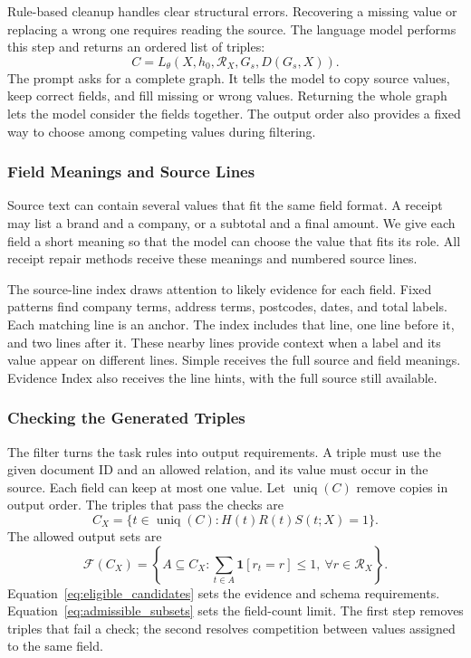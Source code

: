 Rule-based cleanup handles clear structural errors.
Recovering a missing value or replacing a wrong one requires reading the source.
The language model performs this step and returns an ordered list of triples:
\begin{equation}
    \label{eq:proposal_generation}
    C=L_\theta(X,h_0,\mathcal R_X,G_s,D(G_s,X)).
\end{equation}
The prompt asks for a complete graph. It tells the model to copy source
values, keep correct fields, and fill missing or wrong values.
Returning the whole graph lets the model consider the fields together.
The output order also provides a fixed way to choose among competing
values during filtering.

\subsubsection{Field Meanings and Source Lines}
\label{sec:framework:field_evidence}

Source text can contain several values that fit the same field format.
A receipt may list a brand and a company, or a subtotal and a final amount.
We give each field a short meaning so that the model can choose the value
that fits its role. All receipt repair methods receive these meanings
and numbered source lines.

The source-line index draws attention to likely evidence for each field.
Fixed patterns find company terms, address terms, postcodes, dates, and total labels.
Each matching line is an anchor. The index includes that line, one line
before it, and two lines after it. These nearby lines provide context when
a label and its value appear on different lines.
Simple receives the full source and field meanings.
Evidence Index also receives the line hints, with the full source still available.

\subsubsection{Checking the Generated Triples}
\label{sec:framework:constraints}

The filter turns the task rules into output requirements.
A triple must use the given document ID and an allowed relation, and its
value must occur in the source. Each field can keep at most one value.
Let $\operatorname{uniq}(C)$ remove copies in output order.
The triples that pass the checks are
\begin{equation}
    \label{eq:eligible_candidates}
    C_X=\{t\in\operatorname{uniq}(C):H(t)R(t)S(t;X)=1\}.
\end{equation}
The allowed output sets are
\begin{equation}
    \label{eq:admissible_subsets}
    \mathcal F(C_X)=\left\{A\subseteq C_X:
    \sum_{t\in A}\mathbf1[r_t=r]\leq1,\ \forall r\in\mathcal R_X\right\}.
\end{equation}
Equation~\ref{eq:eligible_candidates} sets the evidence and schema requirements.
Equation~\ref{eq:admissible_subsets} sets the field-count limit.
The first step removes triples that fail a check; the second resolves
competition between values assigned to the same field.

